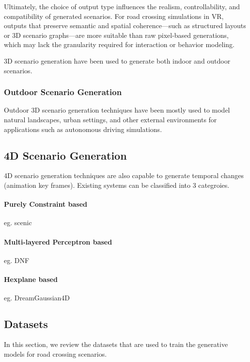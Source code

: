 \documentclass{article}
\begin{document}
Ultimately, the choice of output type influences the realism, controllability, and compatibility of generated scenarios. For road crossing simulations in VR, outputs that preserve semantic and spatial coherence—such as structured layouts or 3D scenario graphs—are more suitable than raw pixel-based generations, which may lack the granularity required for interaction or behavior modeling.


3D scenario generation have been used to generate both indoor and outdoor scenarios.


\subsubsection{Outdoor Scenario Generation}

Outdoor 3D scenario generation techniques have been mostly used to model natural landscapes, urban settings, and other external environments for applications such as autonomous driving simulations.

\subsection{4D Scenario Generation}

4D scenario generation techniques are also capable to generate temporal changes (animation key frames). Existing systems can be classified into 3 categroies.

\paragraph{Purely Constraint based} eg. scenic

\paragraph{Multi-layered Perceptron based} eg. DNF

\paragraph{Hexplane based} eg. DreamGaussian4D

\subsection{Datasets}

In this section, we review the datasets that are used to train the generative models for road crossing scenarios. 
\end{document}
